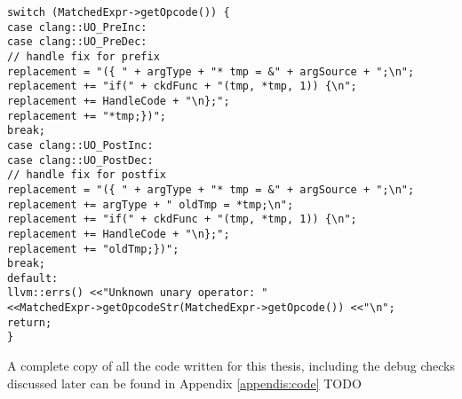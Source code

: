 \begin{center}
\parbox{0.95\linewidth}{
\texttt{switch (MatchedExpr-\textgreater getOpcode()) \{\\
\hspace*{2em}case clang::UO\_PreInc:\\
\hspace*{2em}case clang::UO\_PreDec:\\
\hspace*{4em}// handle fix for prefix\\
\hspace*{4em}replacement = "(\{ " + argType + "* tmp = \&" + argSource + ";\textbackslash n";\\
\hspace*{4em}replacement += "if(" + ckdFunc + "(tmp, *tmp, 1)) \{\textbackslash n";\\
\hspace*{4em}replacement += HandleCode + "\textbackslash n\};";\\
\hspace*{4em}replacement += "*tmp;\})";\\
\hspace*{4em}break;\\[1em]
\hspace*{2em}case clang::UO\_PostInc:\\
\hspace*{2em}case clang::UO\_PostDec:\\
\hspace*{4em}// handle fix for postfix\\
\hspace*{4em}replacement = "(\{ " + argType + "* tmp = \&" + argSource + ";\textbackslash n";\\
\hspace*{4em}replacement += argType + " oldTmp = *tmp;\textbackslash n";\\
\hspace*{4em}replacement += "if(" + ckdFunc + "(tmp, *tmp, 1)) \{\textbackslash n";\\
\hspace*{4em}replacement += HandleCode + "\textbackslash n\};";\\
\hspace*{4em}replacement += "oldTmp;\})";\\
\hspace*{4em}break;\\[1em]
\hspace*{2em}default:\\
\hspace*{4em}llvm::errs() \textless\textless "Unknown unary operator: " \\
\hspace*{6em}\textless\textless MatchedExpr-\textgreater getOpcodeStr(MatchedExpr-\textgreater getOpcode()) \textless\textless "\textbackslash n";\\
\hspace*{4em}return;\\
\}
}}
\end{center}

A complete copy of all the code written for this thesis, including the debug checks discussed later can be found in Appendix \ref{appendis:code} TODO